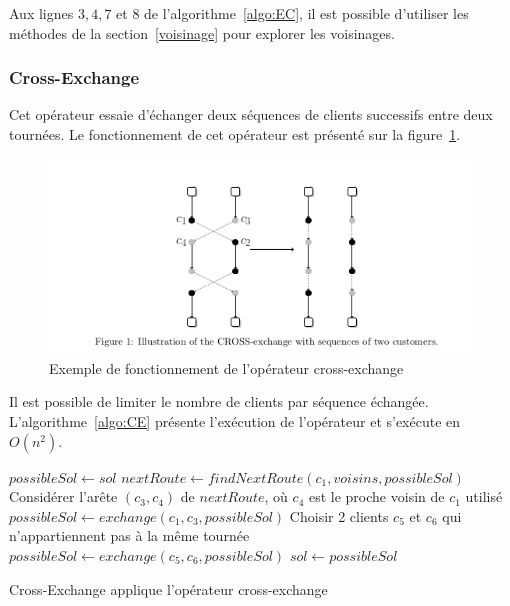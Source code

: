\documentclass[a4paper,11pt]{article}%
\begin{document}
Aux lignes $3, 4, 7$ et $8$ de l'algorithme~\ref{algo:EC}, il est possible d'utiliser les méthodes de la section~\ref{voisinage} pour explorer les voisinages.

\subsubsection{Cross-Exchange}

Cet opérateur essaie d'échanger deux séquences de clients successifs entre deux tournées. Le fonctionnement de cet opérateur est présenté sur la figure~\ref{CE}.

\begin{figure}
\centering
\includegraphics[scale=0.4]{cross_exchange.png}
\caption{Exemple de fonctionnement de l'opérateur cross-exchange}
\label{CE}
\end{figure}

Il est possible de limiter le nombre de clients par séquence échangée.
L'algorithme~\ref{algo:CE} présente l'exécution de l'opérateur et s'exécute en $O(n^2)$.

\begin{algorithm}
\DontPrintSemicolon %
$possibleSol \gets sol$\;
$nextRoute \gets findNextRoute(c_1,voisins,possibleSol)$\;
Considérer l'arête $(c_3,c_4)$ de $nextRoute$, où $c_4$ est le proche voisin de $c_1$ utilisé\;
$possibleSol \gets exchange(c_1,c_3,possibleSol)$\;
Choisir 2 clients $c_5$ et $c_6$ qui n'appartiennent pas à la même tournée\;
$possibleSol \gets exchange(c_5,c_6,possibleSol)$\;
 {
	$sol \gets possibleSol$\;
}
\;
\caption{{\sc Cross-Exchange} applique l'opérateur cross-exchange}
\label{algo:CE}
\end{algorithm}
\end{document}
